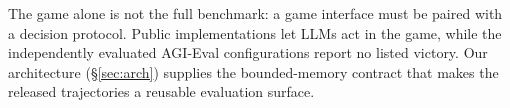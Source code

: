 The game alone is not the full benchmark: a game interface must
be paired with a decision protocol. Public \stspad{}
implementations \citep{sts2mcp-2026,hermesbridge-2026,%
ai-spire-2026,chartyr-sts2-2026} let LLMs act in the game, while
the independently evaluated AGI-Eval configurations
\citep{agi-eval-spire-2026} report no listed victory. Our
architecture (\S\ref{sec:arch}) supplies the bounded-memory
contract that makes the released trajectories a reusable evaluation
surface.
